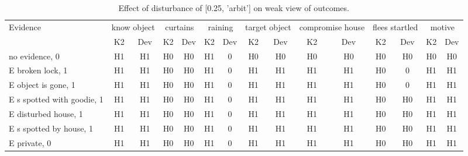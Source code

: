 \begin{table}\begin{tabular}{l|cc|cc|cc|cc|cc|cc|cc}\toprule\multirow{2}{*}{Evidence} & \multicolumn{2}{c}{know object}& \multicolumn{2}{c}{curtains}& \multicolumn{2}{c}{raining}& \multicolumn{2}{c}{target object}& \multicolumn{2}{c}{compromise house}& \multicolumn{2}{c}{flees startled}& \multicolumn{2}{c}{motive}\\& {K2} & {Dev}& {K2} & {Dev}& {K2} & {Dev}& {K2} & {Dev}& {K2} & {Dev}& {K2} & {Dev}& {K2} & {Dev}\\\midrule
no evidence, 0 & H1&H1&H0&H0&\cellcolor{Bittersweet}H1&\cellcolor{Bittersweet}0&H0&H0&H0&H0&H0&H0&H0&H0\\E broken lock, 1 & H1&H1&H0&H0&\cellcolor{Bittersweet}H1&\cellcolor{Bittersweet}0&H1&H1&H1&H1&\cellcolor{Bittersweet}H0&\cellcolor{Bittersweet}0&H1&H1\\E object is gone, 1 & H1&H1&H0&H0&\cellcolor{Bittersweet}H1&\cellcolor{Bittersweet}0&H1&H1&H1&H1&\cellcolor{Bittersweet}H0&\cellcolor{Bittersweet}0&H1&H1\\E s spotted with goodie, 1 & H1&H1&H0&H0&\cellcolor{Bittersweet}H1&\cellcolor{Bittersweet}0&H1&H1&H1&H1&H0&H0&H1&H1\\E disturbed house, 1 & H1&H1&H0&H0&\cellcolor{Bittersweet}H1&\cellcolor{Bittersweet}0&H1&H1&H1&H1&H0&H0&H1&H1\\E s spotted by house, 1 & H1&H1&H0&H0&\cellcolor{Bittersweet}H1&\cellcolor{Bittersweet}0&H1&H1&H1&H1&H0&H0&H1&H1\\E private, 0 & H1&H1&H0&H0&\cellcolor{Bittersweet}H1&\cellcolor{Bittersweet}0&H1&H1&H1&H1&H0&H0&H1&H1\\\bottomrule\end{tabular}\caption{Effect of disturbance of [0.25, 'arbit'] on weak view of outcomes.}\end{table}